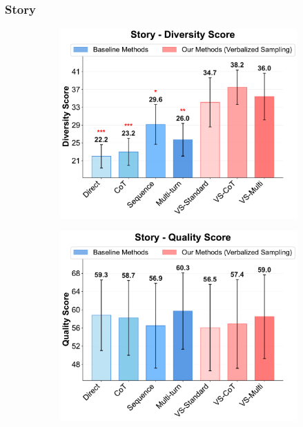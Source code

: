 \newpage
\subsubsection{Story} 

\begin{figure}[!htbp]
  \centering
  \begin{subfigure}[t]{0.48\textwidth}
      \centering
      \includegraphics[width=\textwidth]{figures/creative_writing/story/story_diversity_appendix.pdf}
      \label{fig:story_creative_diversity}
  \end{subfigure}
  \hfill
  \begin{subfigure}[t]{0.48\textwidth}
      \centering
      \includegraphics[width=\textwidth]{figures/creative_writing/story/story_quality_appendix.pdf}

\end{subfigure}
\end{figure}
